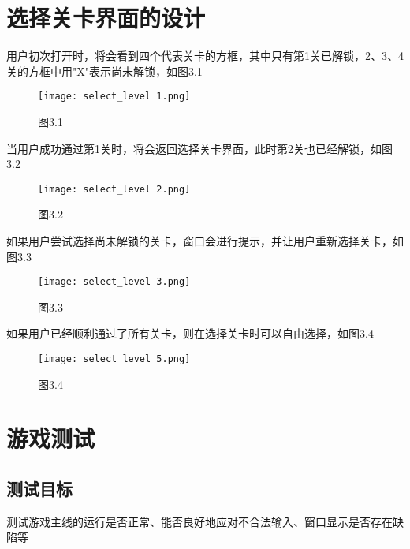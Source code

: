 \documentclass{report}
\begin{document}
    \chapter{选择关卡界面的设计}
    用户初次打开时，将会看到四个代表关卡的方框，其中只有第1关已解锁，2、3、4关的方框中用"X"表示尚未解锁，如图3.1\vspace{-1em}\\
    \begin{figure}[htbp]
        \centering
        \texttt{[image: select\_level 1.png]}
        \caption*{图3.1}
      \end{figure}\par
    当用户成功通过第1关时，将会返回选择关卡界面，此时第2关也已经解锁，如图3.2\vspace{-1em}\\
    \begin{figure}[htbp]
        \centering
        \texttt{[image: select\_level 2.png]}
        \caption*{图3.2}
    \end{figure}\newpage
    如果用户尝试选择尚未解锁的关卡，窗口会进行提示，并让用户重新选择关卡，如图3.3\vspace{-1em}\\
    \begin{figure}[htbp]
        \centering
        \texttt{[image: select\_level 3.png]}
        \caption*{图3.3}
    \end{figure}\par
    如果用户已经顺利通过了所有关卡，则在选择关卡时可以自由选择，如图3.4\vspace{-1em}\\
    \begin{figure}[htbp]
        \centering
        \texttt{[image: select\_level 5.png]}
        \caption*{图3.4}
    \end{figure}



    \chapter{游戏测试}
    \section{测试目标}
    测试游戏主线的运行是否正常、能否良好地应对不合法输入、窗口显示是否存在缺陷等
\end{document}
